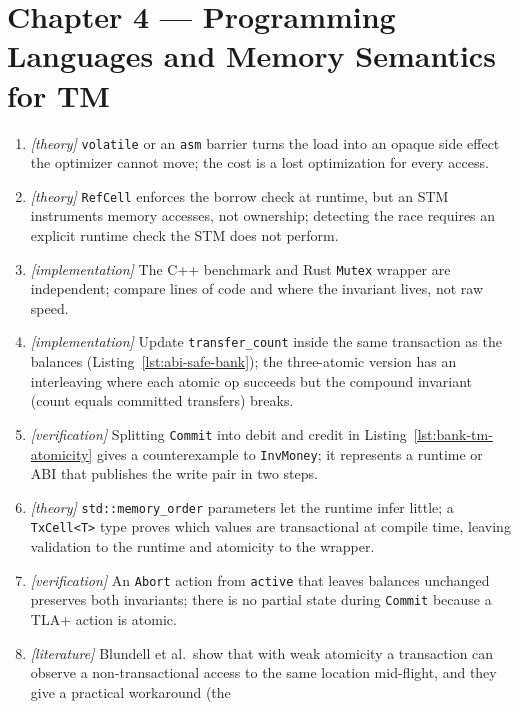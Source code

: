 \section*{Chapter 4 --- Programming Languages and Memory Semantics for TM}

\begin{enumerate}
    \item \emph{[theory]} \texttt{volatile} or an \texttt{asm} barrier turns
          the load into an opaque side effect the optimizer cannot move;
          the cost is a lost optimization for every access.
    \item \emph{[theory]} \texttt{RefCell} enforces the borrow check at
          runtime, but an STM instruments memory accesses, not ownership;
          detecting the race requires an explicit runtime check the STM does
          not perform.
    \item \emph{[implementation]} The C++ benchmark and Rust
          \texttt{Mutex} wrapper are independent; compare lines of code and
          where the invariant lives, not raw speed.
    \item \emph{[implementation]} Update \texttt{transfer\_count} inside the
          same transaction as the balances
          (Listing~\ref{lst:abi-safe-bank}); the three-atomic version has an
          interleaving where each atomic op succeeds but the compound
          invariant (count equals committed transfers) breaks.
    \item \emph{[verification]} Splitting \texttt{Commit} into debit and
          credit in Listing~\ref{lst:bank-tm-atomicity} gives a
          counterexample to \texttt{InvMoney}; it represents a runtime or
          ABI that publishes the write pair in two steps.
    \item \emph{[theory]} \texttt{std::memory\_order} parameters let the
          runtime infer little; a \texttt{TxCell<T>} type proves which
          values are transactional at compile time, leaving validation to
          the runtime and atomicity to the wrapper.
    \item \emph{[verification]} An \texttt{Abort} action from
          \texttt{active} that leaves balances unchanged preserves both
          invariants; there is no partial state during \texttt{Commit}
          because a TLA+ action is atomic.
    \item \emph{[literature]} Blundell et al.\ show that with weak atomicity
          a transaction can observe a non-transactional access to the same
          location mid-flight, and they give a practical workaround (the

\end{enumerate}
